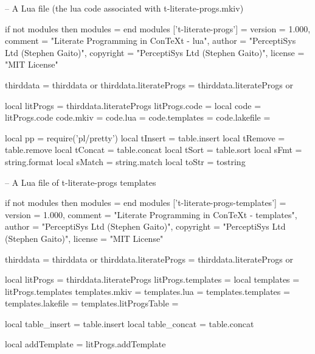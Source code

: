\stopMkIVCode

\startLuaCode
-- A Lua file (the lua code associated with t-literate-progs.mkiv)

if not modules then modules = { } end
modules ['t-literate-progs'] = {
    version   = 1.000,
    comment   = "Literate Programming in ConTeXt - lua",
    author    = "PerceptiSys Ltd (Stephen Gaito)",
    copyright = "PerceptiSys Ltd (Stephen Gaito)",
    license   = "MIT License"
}

thirddata               = thirddata               or {}
thirddata.literateProgs = thirddata.literateProgs or {}

local litProgs  = thirddata.literateProgs
litProgs.code   = {}
local code      = litProgs.code
code.mkiv       = {}
code.lua        = {}
code.templates  = {}
code.lakefile   = {}

local pp = require('pl/pretty')
local tInsert = table.insert
local tRemove = table.remove
local tConcat = table.concat
local tSort   = table.sort
local sFmt    = string.format
local sMatch  = string.match
local toStr   = tostring
\stopLuaCode

\startLuaTemplate
-- A Lua file of t-literate-progs templates

if not modules then modules = { } end
modules ['t-literate-progs-templates'] = {
    version   = 1.000,
    comment   = "Literate Programming in ConTeXt - templates",
    author    = "PerceptiSys Ltd (Stephen Gaito)",
    copyright = "PerceptiSys Ltd (Stephen Gaito)",
    license   = "MIT License"
}

thirddata               = thirddata               or {}
thirddata.literateProgs = thirddata.literateProgs or {}

local litProgs          = thirddata.literateProgs
litProgs.templates      = {}
local templates         = litProgs.templates
templates.mkiv          = {}
templates.lua           = {}
templates.templates     = {}
templates.lakefile      = {}
templates.litProgsTable = {}

local table_insert = table.insert
local table_concat = table.concat

local addTemplate = litProgs.addTemplate
\stopLuaTemplate

\stopchapter
